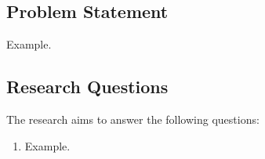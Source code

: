\subsection{Problem Statement}

Example.

\subsection{Research Questions}

The research aims to answer the following questions:
\begin{enumerate}
	\item Example.
\end{enumerate}
